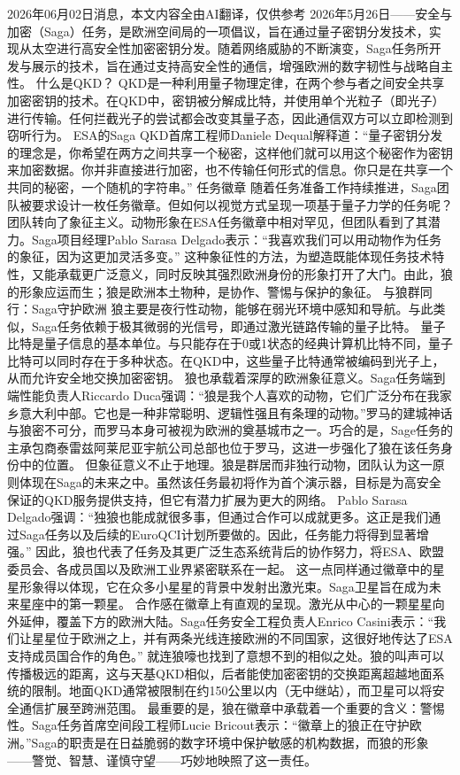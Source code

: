 \documentclass[12pt,a4paper]{ctexart}
\begin{document}
2026年06月02日消息，本文内容全由AI翻译，仅供参考
2026年5月26日——安全与加密（Saga）任务，是欧洲空间局的一项倡议，旨在通过量子密钥分发技术，实现从太空进行高安全性加密密钥分发。随着网络威胁的不断演变，Saga任务所开发与展示的技术，旨在通过支持高安全性的通信，增强欧洲的数字韧性与战略自主性。
什么是QKD？
QKD是一种利用量子物理定律，在两个参与者之间安全共享加密密钥的技术。在QKD中，密钥被分解成比特，并使用单个光粒子（即光子）进行传输。任何拦截光子的尝试都会改变其量子态，因此通信双方可以立即检测到窃听行为。
ESA的Saga QKD首席工程师Daniele Dequal解释道：“量子密钥分发的理念是，你希望在两方之间共享一个秘密，这样他们就可以用这个秘密作为密钥来加密数据。你并非直接进行加密，也不传输任何形式的信息。你只是在共享一个共同的秘密，一个随机的字符串。”
任务徽章
随着任务准备工作持续推进，Saga团队被要求设计一枚任务徽章。但如何以视觉方式呈现一项基于量子力学的任务呢？
团队转向了象征主义。动物形象在ESA任务徽章中相对罕见，但团队看到了其潜力。Saga项目经理Pablo Sarasa Delgado表示：“我喜欢我们可以用动物作为任务的象征，因为这更加灵活多变。”
这种象征性的方法，为塑造既能体现任务技术特性，又能承载更广泛意义，同时反映其强烈欧洲身份的形象打开了大门。由此，狼的形象应运而生；狼是欧洲本土物种，是协作、警惕与保护的象征。
与狼群同行：Saga守护欧洲
狼主要是夜行性动物，能够在弱光环境中感知和导航。与此类似，Saga任务依赖于极其微弱的光信号，即通过激光链路传输的量子比特。
量子比特是量子信息的基本单位。与只能存在于0或1状态的经典计算机比特不同，量子比特可以同时存在于多种状态。在QKD中，这些量子比特通常被编码到光子上，从而允许安全地交换加密密钥。
狼也承载着深厚的欧洲象征意义。Saga任务端到端性能负责人Riccardo Duca强调：“狼是我个人喜欢的动物，它们广泛分布在我家乡意大利中部。它也是一种非常聪明、逻辑性强且有条理的动物。”罗马的建城神话与狼密不可分，而罗马本身可被视为欧洲的奠基城市之一。巧合的是，Sage任务的主承包商泰雷兹阿莱尼亚宇航公司总部也位于罗马，这进一步强化了狼在该任务身份中的位置。
但象征意义不止于地理。狼是群居而非独行动物，团队认为这一原则体现在Saga的未来之中。虽然该任务最初将作为首个演示器，目标是为高安全保证的QKD服务提供支持，但它有潜力扩展为更大的网络。
Pablo Sarasa Delgado强调：“独狼也能成就很多事，但通过合作可以成就更多。这正是我们通过Saga任务以及后续的EuroQCI计划所要做的。因此，任务能力将得到显著增强。”
因此，狼也代表了任务及其更广泛生态系统背后的协作努力，将ESA、欧盟委员会、各成员国以及欧洲工业界紧密联系在一起。
这一点同样通过徽章中的星星形象得以体现，它在众多小星星的背景中发射出激光束。Saga卫星旨在成为未来星座中的第一颗星。
合作感在徽章上有直观的呈现。激光从中心的一颗星星向外延伸，覆盖下方的欧洲大陆。Saga任务安全工程负责人Enrico Casini表示：“我们让星星位于欧洲之上，并有两条光线连接欧洲的不同国家，这很好地传达了ESA支持成员国合作的角色。”
就连狼嚎也找到了意想不到的相似之处。狼的叫声可以传播极远的距离，这与天基QKD相似，后者能使加密密钥的交换距离超越地面系统的限制。地面QKD通常被限制在约150公里以内（无中继站），而卫星可以将安全通信扩展至跨洲范围。
最重要的是，狼在徽章中承载着一个重要的含义：警惕性。Saga任务首席空间段工程师Lucie Bricout表示：“徽章上的狼正在守护欧洲。”Saga的职责是在日益脆弱的数字环境中保护敏感的机构数据，而狼的形象——警觉、智慧、谨慎守望——巧妙地映照了这一责任。
\end{document}
